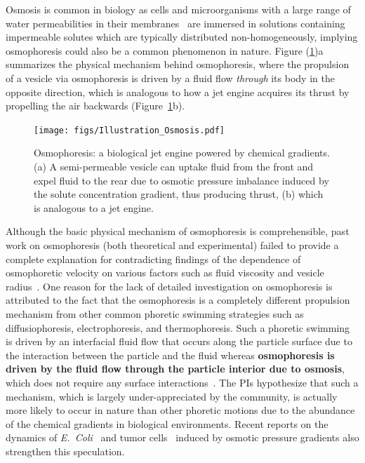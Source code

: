 \documentclass[11pt]{article}
\begin{document}
Osmosis is common in biology as cells and microorganisms with a large
range of water permeabilities in their membranes~\cite{deamer1986,
finkelstein1976, lawaczeck1979} are immersed in solutions containing
impermeable solutes which are typically distributed non-homogeneously,
implying osmophoresis could also be a common phenomenon in nature.
Figure (\ref{fig:illustration})a summarizes the physical mechanism
behind osmophoresis, where the propulsion of a vesicle via osmophoresis
is driven by a fluid flow {\em through} its body in the opposite
direction, which is analogous to how a jet engine acquires its thrust by
propelling the air backwards (Figure~\ref{fig:illustration}b). 
\begin{figure}[h]
\begin{center}
\texttt{[image: figs/Illustration\_Osmosis.pdf]}
\caption{Osmophoresis: a biological jet engine powered by chemical
  gradients. (a) A semi-permeable vesicle can uptake fluid from the
  front and expel fluid to the rear due to osmotic pressure imbalance
  induced by the solute concentration gradient, thus producing thrust,
  (b) which is analogous to a jet engine.}
\label{fig:illustration}
\end{center}
\end{figure}

Although the basic physical mechanism of osmophoresis is comprehensible,
past work on osmophoresis (both theoretical and experimental) failed to
provide a complete explanation for contradicting findings of the
dependence of osmophoretic velocity on various factors such as fluid
viscosity and vesicle radius~\cite{anderson1983, anderson1986,
gordon1981, nardi1999}.  One reason for the lack of detailed
investigation on osmophoresis is attributed to the fact that the
osmophoresis is a completely different propulsion mechanism from other
common phoretic swimming strategies such as diffusiophoresis,
electrophoresis, and thermophoresis. Such a phoretic swimming is driven
by an interfacial fluid flow that occurs along the particle surface due
to the interaction between the particle and the fluid whereas {\bf
osmophoresis is driven by the fluid flow through the particle interior
due to osmosis}, which does not require any surface
interactions~\cite{anderson1986,anderson1989}. The PIs hypothesize that
such a mechanism, which is largely under-appreciated by the community,
is actually more likely to occur in nature than other phoretic motions
due to the abundance of the chemical gradients in biological
environments. Recent reports on the dynamics of {\em
E.~Coli}~\cite{rosko2017} and tumor cells~\cite{stroka2014} induced by
osmotic pressure gradients also strengthen this speculation. 
\end{document}
